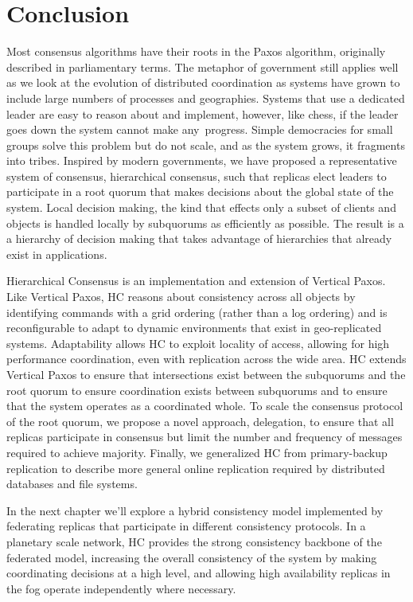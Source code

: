 \section{Conclusion}

Most consensus algorithms have their roots in the Paxos algorithm, originally described in parliamentary terms.
The metaphor of government still applies well as we look at the evolution of distributed coordination as systems have grown to include large numbers of processes and geographies.
Systems that use a dedicated leader are easy to reason about and implement, however, like chess, if the leader goes down the system cannot make any\ progress.
Simple democracies for small groups solve this problem but do not scale, and as the system grows, it fragments into tribes.
Inspired by modern governments, we have proposed a representative system of consensus, hierarchical consensus, such that replicas elect leaders to participate in a root quorum that makes decisions about the global state of the system.
Local decision making, the kind that effects only a subset of clients and objects is handled locally by subquorums as efficiently as possible.
The result is a a hierarchy of decision making that takes advantage of hierarchies that already exist in applications.

Hierarchical Consensus is an implementation and extension of Vertical Paxos.
Like Vertical Paxos, HC reasons about consistency across all objects by identifying commands with a grid ordering (rather than a log ordering) and is reconfigurable to adapt to dynamic environments that exist in geo-replicated systems.
Adaptability allows HC to exploit locality of access, allowing for high performance coordination, even with replication across the wide area.
HC extends Vertical Paxos to ensure that intersections exist between the subquorums and the root quorum to ensure coordination exists between subquorums and to ensure that the system operates as a coordinated whole.
To scale the consensus protocol of the root quorum, we propose a novel approach, delegation, to ensure that all replicas participate in consensus but limit the number and frequency of messages required to achieve majority.
Finally, we generalized HC from primary-backup replication to describe more general online replication required by distributed databases and file systems.

In the next chapter we'll explore a hybrid consistency model implemented by federating replicas that participate in different consistency protocols.
In a planetary scale network, HC provides the strong consistency backbone of the federated model, increasing the overall consistency of the system by making coordinating decisions at a high level, and allowing high availability replicas in the fog operate independently where necessary.
